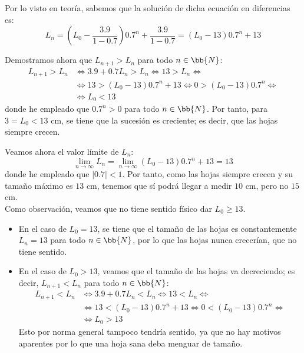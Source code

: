 \begin{ejercicio}
\begin{enumerate}
        Por lo visto en teoría, sabemos que la solución de dicha ecuación en diferencias es:
        \begin{equation*}
            L_n = \left(L_0 - \frac{3.9}{1-0.7}\right)0.7^n + \frac{3.9}{1-0.7} = (L_0-13)0.7^n + 13
        \end{equation*}

        Demostramos ahora que $L_{n+1}>L_{n}$ para todo $n\in \bb{N}$:
        \begin{align*}
            L_{n+1} > L_n &\Longleftrightarrow 3.9+0.7L_n>L_n  \Longleftrightarrow 13>L_n \Longleftrightarrow \\
            &\Longleftrightarrow 13 > (L_0-13)0.7^n + 13 \Longleftrightarrow 0>(L_0-13)0.7^n
            \Longleftrightarrow \\ &\Longleftrightarrow L_0<13
        \end{align*}
        donde he empleado que $0.7^n>0$ para todo $n\in \bb{N}$. Por tanto, para $3=L_0<13$ cm, se tiene que la sucesión es creciente; es decir, que las hojas siempre crecen.

        Veamos ahora el valor límite de $L_n$:
        \begin{equation*}
            \lim_{n\to \infty} L_n = \lim_{n\to \infty} (L_0-13)0.7^n + 13 = 13
        \end{equation*}
        donde he empleado que $|0.7|<1$. Por tanto, como las hojas siempre crecen y su tamaño máximo es $13$ cm, tenemos que sí podrá llegar a medir $10$ cm, pero no $15$ cm.\\

        Como observación, veamos que no tiene sentido físico dar $L_0\geq 13$.
        \begin{itemize}
            \item En el caso de $L_0=13$, se tiene que el tamaño de las hojas es constantemente $L_n=13$ para todo $n\in \bb{N}$, por lo que las hojas nunca crecerían, que no tiene sentido.

            \item En el caso de $L_0>13$, veamos que el tamaño de las hojas va decreciendo; es decir, $L_{n+1}<L_n$ para todo $n\in \bb{N}$:
            \begin{align*}
                L_{n+1} < L_n &\Longleftrightarrow 3.9+0.7L_n<L_n  \Longleftrightarrow 13<L_n \Longleftrightarrow \\
                &\Longleftrightarrow 13 < (L_0-13)0.7^n + 13 \Longleftrightarrow 0<(L_0-13)0.7^n
                \Longleftrightarrow \\ &\Longleftrightarrow L_0>13
            \end{align*}
            Esto por norma general tampoco tendría sentido, ya que no hay motivos aparentes por lo que una hoja sana deba menguar de tamaño.
        \end{itemize}
    \end{enumerate}
\end{ejercicio}